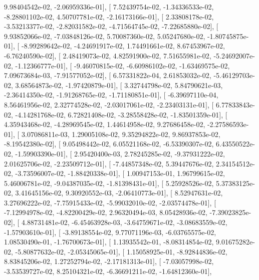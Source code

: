 \documentclass{article}
\begin{document}
          9.98404542e-02,  -2.06959336e-01],
       [  7.52439754e-02,  -1.34336533e-02,  -8.28801102e-02,
          4.50707781e-02,  -2.16173166e-01],
       [  2.33808178e-02,  -3.53213377e-02,  -2.82031582e-02,
         -4.71564745e-02,  -7.22685880e-02],
       [  9.93852066e-02,  -7.03848126e-02,   5.70087360e-02,
          5.05247680e-02,  -1.80745875e-01],
       [ -8.99289642e-02,  -4.24691917e-02,   1.74491661e-02,
          8.67453967e-02,  -6.76240590e-02],
       [  2.48419073e-02,   4.82591900e-02,   7.51655981e-02,
         -5.24692007e-02,  -1.12366777e-01],
       [ -9.46070815e-02,  -6.60986102e-02,  -1.63469575e-02,
          7.09673684e-03,  -7.91577052e-02],
       [  6.57331822e-04,   2.61853032e-02,  -5.46129703e-02,
          3.68564873e-02,  -1.97420879e-01],
       [  3.32744798e-02,   5.84790621e-03,  -2.36414350e-02,
         -1.91268765e-02,  -1.71180851e-01],
       [ -6.39697110e-04,   8.56461956e-02,   2.32774528e-02,
         -2.03017061e-02,  -2.23403131e-01],
       [  6.77833843e-02,  -4.14281768e-02,   6.72821408e-02,
         -3.28558428e-02,  -1.83501359e-01],
       [  4.35943468e-02,  -4.28969545e-02,   1.44614958e-02,
          9.27686458e-02,  -2.27586593e-01],
       [  3.07086811e-03,   1.29005108e-02,   9.35294822e-02,
          9.86937853e-02,  -8.19542380e-02],
       [  9.05498442e-02,   6.05521168e-02,  -6.53390307e-02,
          6.43550522e-02,  -1.59903390e-01],
       [  2.95420400e-03,   2.78245285e-02,  -9.37931222e-02,
          2.01625706e-02,  -2.23509712e-01],
       [ -7.44857348e-02,   5.39447676e-02,   2.34154512e-02,
         -3.73596007e-02,  -1.88420338e-01],
       [  1.00947153e-01,   1.96799615e-02,   5.46006781e-02,
         -9.04387035e-02,  -1.81398431e-01],
       [  5.25928526e-02,   5.37383125e-02,   3.41645156e-02,
          9.30920552e-03,  -2.06410773e-01],
       [  8.52947631e-02,   3.27696222e-02,  -7.75915433e-02,
         -5.99032010e-02,  -2.03574478e-01],
       [ -7.12994978e-02,  -4.82200429e-02,   2.96320494e-03,
          8.05428936e-02,  -7.39023825e-02],
       [  4.88731481e-02,  -6.45463928e-03,  -3.64759671e-02,
         -3.08683559e-02,  -1.57903610e-01],
       [ -3.89138554e-02,   9.77071196e-03,  -6.03765575e-02,
          1.08530490e-01,  -1.76700673e-01],
       [  1.13935542e-01,  -8.08314854e-02,   9.01675282e-02,
         -5.80877632e-02,  -2.05345065e-01],
       [  1.15058925e-01,  -8.92844836e-02,   8.83845206e-02,
          1.27252794e-02,  -2.17181313e-01],
       [ -7.03057998e-02,  -3.53539727e-02,   8.25104321e-02,
         -6.36691211e-02,  -1.64812360e-01],
\end{document}

